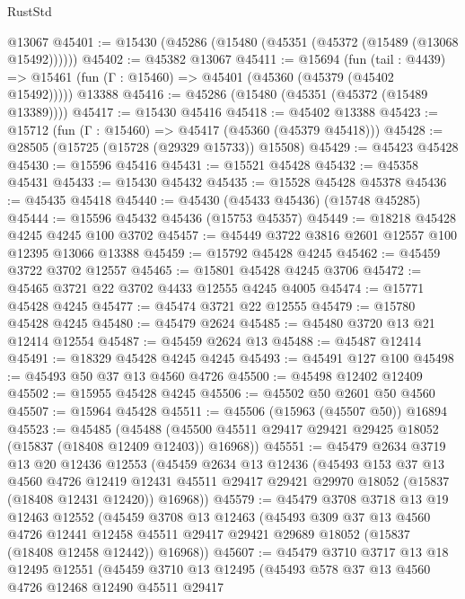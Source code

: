 \begin{lexlean}{RustStd}
\begin{coremodule}
    @13067
@45401 := @15430 (@45286 (@15480 (@45351 (@45372 (@15489 (@13068 @15492))))))
@45402 := @45382 @13067
@45411 := @15694
    (fun (tail : @4439) => @15461 (fun (Γ : @15460) => @45401 (@45360 (@45379 (@45402 @15492)))))
    @13388
@45416 := @45286 (@15480 (@45351 (@45372 (@15489 @13389))))
@45417 := @15430 @45416
@45418 := @45402 @13388
@45423 := @15712 (fun (Γ : @15460) => @45417 (@45360 (@45379 @45418)))
@45428 := @28505 (@15725 (@15728 (@29329 @15733)) @15508)
@45429 := @45423 @45428
@45430 := @15596 @45416
@45431 := @15521 @45428
@45432 := @45358 @45431
@45433 := @15430 @45432
@45435 := @15528 @45428 @45378
@45436 := @45435 @45418
@45440 := @45430 (@45433 @45436) (@15748 @45285)
@45444 := @15596 @45432 @45436 (@15753 @45357)
@45449 := @18218 @45428 @4245 @4245 @100 @3702
@45457 := @45449 @3722 @3816 @2601 @12557 @100 @12395 @13066 @13388
@45459 := @15792 @45428 @4245
@45462 := @45459 @3722 @3702 @12557
@45465 := @15801 @45428 @4245 @3706
@45472 := @45465 @3721 @22 @3702 @4433 @12555 @4245 @4005
@45474 := @15771 @45428 @4245
@45477 := @45474 @3721 @22 @12555
@45479 := @15780 @45428 @4245
@45480 := @45479 @2624
@45485 := @45480 @3720 @13 @21 @12414 @12554
@45487 := @45459 @2624 @13
@45488 := @45487 @12414
@45491 := @18329 @45428 @4245 @4245
@45493 := @45491 @127 @100
@45498 := @45493 @50 @37 @13 @4560 @4726
@45500 := @45498 @12402 @12409
@45502 := @15955 @45428 @4245
@45506 := @45502 @50 @2601 @50 @4560
@45507 := @15964 @45428
@45511 := @45506 (@15963 (@45507 @50)) @16894
@45523 := @45485
    (@45488 (@45500 @45511 @29417 @29421 @29425 @18052 (@15837 (@18408 @12409 @12403)) @16968))
@45551 := @45479
    @2634
    @3719
    @13
    @20
    @12436
    @12553
    (@45459
      @2634
      @13
      @12436
      (@45493
        @153
        @37
        @13
        @4560
        @4726
        @12419
        @12431
        @45511
        @29417
        @29421
        @29970
        @18052
        (@15837 (@18408 @12431 @12420))
        @16968))
@45579 := @45479
    @3708
    @3718
    @13
    @19
    @12463
    @12552
    (@45459
      @3708
      @13
      @12463
      (@45493
        @309
        @37
        @13
        @4560
        @4726
        @12441
        @12458
        @45511
        @29417
        @29421
        @29689
        @18052
        (@15837 (@18408 @12458 @12442))
        @16968))
@45607 := @45479
    @3710
    @3717
    @13
    @18
    @12495
    @12551
    (@45459
      @3710
      @13
      @12495
      (@45493
        @578
        @37
        @13
        @4560
        @4726
        @12468
        @12490
        @45511
        @29417

\end{coremodule}
\end{lexlean}
